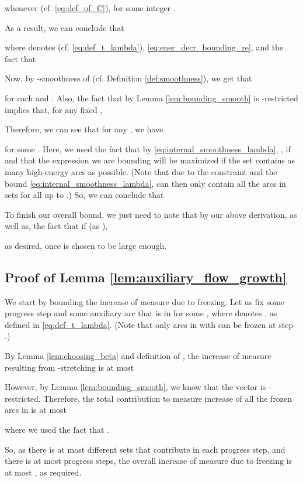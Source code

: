 \documentclass[11pt, letterpaper]{article}
\begin{document}
whenever  (cf. \eqref{eq:def_of_C}), for some integer . 

As a result, we can conclude that

where  denotes  (cf. \eqref{eq:def_t_lambda}), \eqref{eq:ener_decr_bounding_re}, and the fact that 

Now, by -smoothness of  (cf. Definition \ref{def:smoothness}), we get that 

for each  and . Also, the fact that by Lemma \ref{lem:bounding_smooth}  is -restricted implies that, for any fixed , 

Therefore, we can see that for any , we have

for some . Here, we used the fact that by \eqref{eq:internal_smoothness_lambda}, , if  and that the expression we are bounding will be maximized if the set  contains as many high-energy arcs as possible. (Note that due to the constraint  and the bound \eqref{eq:internal_smoothness_lambda},  can then only contain all the arcs in sets  for all  up to .) So, we can conclude that



To finish our overall bound, we just need to note that by our above derivation, as well as, the fact that  if  (as ),

as desired, once  is chosen to be large enough.

\subsection{Proof of Lemma \ref{lem:auxiliary_flow_growth}}\label{app:auxiliary_flow_growth}

We start by bounding the increase of measure due to freezing. Let us fix some progress step  and some auxiliary arc  that is in  for some , where  denotes , as defined in \eqref{eq:def_t_lambda}. (Note that only arcs in  with  can be frozen at step .) 

By Lemma \ref{lem:choosing_beta} and definition of , the increase of measure resulting from -stretching  is at most

However, by Lemma \ref{lem:bounding_smooth}, we know that the vector  is -restricted. Therefore, the total contribution to measure increase of all the frozen arcs in  is at most

where we used the fact that . 

So, as there is at most  different sets  that contribute in each progress step, and there is at most  progress steps, the overall increase of measure due to freezing is at most , as required. 
\end{document}
